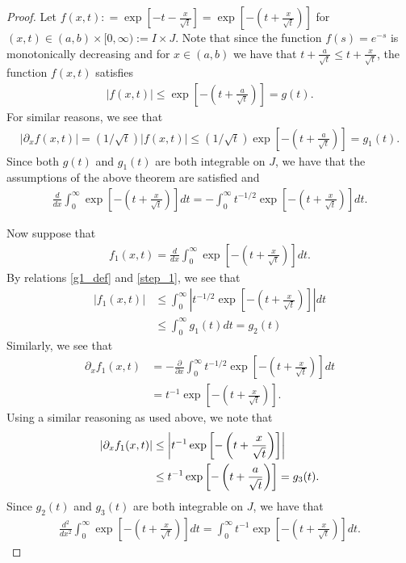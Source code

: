 \documentclass[12pt]{article}
\theoremstyle{definition}
\begin{document}
\begin{proof}
  Let $f(x, t) : = \exp\left[-t - \frac{x}{\sqrt{t}}\right]=\exp\left[-\left(t + \frac{x}{\sqrt{t}}\right)\right]$ for $(x, t) \in (a, b) \times [0, \infty) := I \times J$.
  Note that since the function $f(s) = e^{-s}$ is monotonically
  decreasing and for $x\in(a,b)$ we have that $t + \frac{a}{\sqrt{t}} \leq t + \frac{x}{\sqrt{t}}$, the function $f(x,t)$ satisfies
  \begin{align}
    \left|f(x,t)\right| \leq \exp\left[-\left(t + \frac{a}{\sqrt{t}}\right)\right] = g(t).
  \end{align}
  For similar reasons, we see that
  \begin{align}\label{g1_def}
    \left|\partial_x f(x,t)\right| = (1/\sqrt{t})\left|f(x,t)\right| \leq (1/\sqrt{t})\exp\left[-\left(t + \frac{a}{\sqrt{t}}\right)\right] = g_1(t).
  \end{align}
  Since both $g(t)$ and $g_1(t)$ are both integrable on $J$, we have that the assumptions of the above theorem are satisfied and
  \begin{align}\label{step_1}
    \frac{d}{dx} \int_0^\infty \exp\left[-\left(t + \frac{x}{\sqrt{t}}\right)\right] dt = -\int_0^\infty t^{-1/2}\exp\left[-\left(t + \frac{x}{\sqrt{t}}\right)\right] dt.
  \end{align}

  Now suppose that
  \begin{align*}
    f_1(x,t) = \frac{d}{dx} \int_0^\infty \exp\left[-\left(t + \frac{x}{\sqrt{t}}\right)\right] dt.
  \end{align*}
  By relations \eqref{g1_def} and \eqref{step_1}, we see that
  \begin{align*}
    \left|f_1(x,t)\right| &\leq \int_0^\infty \left|t^{-1/2}\exp\left[-\left(t + \frac{x}{\sqrt{t}}\right)\right]\right| dt \\
    &\leq \int_0^\infty g_1(t) dt  = g_2(t)
  \end{align*}
  Similarly, we see that
  \begin{align*}
    \partial_x f_1(x,t) &= -\frac{\partial}{\partial x} \int_0^\infty t^{-1/2}\exp\left[-\left(t + \frac{x}{\sqrt{t}}\right)\right] dt \\
    &= t^{-1}\exp\left[-\left(t + \frac{x}{\sqrt{t}}\right)\right].
  \end{align*}
  Using a similar reasoning as used above, we note that
  \begin{align}\label{g3_def}
    \left|\partial_x f_1(x,t)\right| &\leq \left|t^{-1}\exp\left[-\left(t + \frac{x}{\sqrt{t}}\right)\right]\right| \notag \\
    &\leq t^{-1}\exp\left[-\left(t + \frac{a}{\sqrt{t}}\right)\right]  = g_3(t).
  \end{align}
  Since $g_2(t)$ and $g_3(t)$ are both integrable on $J$, we have that
  \begin{align}\label{step_2}
    \frac{d^2}{dx^2} \int_0^\infty \exp\left[-\left(t + \frac{x}{\sqrt{t}}\right)\right] dt = \int_0^\infty t^{-1}\exp\left[-\left(t + \frac{x}{\sqrt{t}}\right)\right] dt.
  \end{align}


\end{proof}
\end{document}
